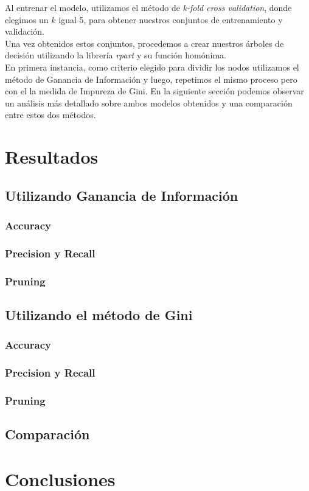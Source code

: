 \documentclass[11pt]{article}
\begin{document}
Al entrenar el modelo, utilizamos el método de \emph{k-fold cross validation},
donde elegimos un $k$ igual 5, para obtener nuestros conjuntos de entrenamiento
y validación. \\

Una vez obtenidos estos conjuntos, procedemos a crear nuestros árboles de 
decisión utilizando la librería \emph{rpart} y su función homónima. \\

En primera instancia, como criterio elegido para dividir los nodos utilizamos el 
método de Ganancia de Información y luego, repetimos el mismo proceso pero con el
la medida de Impureza de Gini. En la siguiente sección podemos observar un análisis
más detallado sobre ambos modelos obtenidos y una comparación entre estos dos métodos.

\section*{Resultados}

\subsection*{Utilizando Ganancia de Información}
\subsubsection*{Accuracy}
\subsubsection*{Precision y Recall}
\subsubsection*{Pruning}

\subsection*{Utilizando el método de Gini}
\subsubsection*{Accuracy}
\subsubsection*{Precision y Recall}
\subsubsection*{Pruning}

\subsection*{Comparación}

\section*{Conclusiones}
\end{document}

